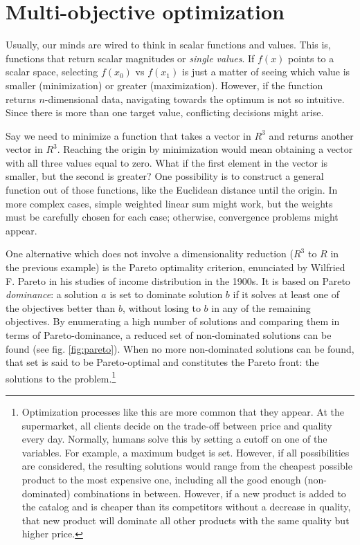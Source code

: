 \section{Multi-objective optimization}
\label{section:multiobjective}

Usually, our minds are wired to think in scalar functions and values. This is, functions that return scalar magnitudes or \textit{single values}. If $f(x)$ points to a scalar space, selecting $f(x_{0})$ vs $f(x_{1})$ is just a matter of seeing which value is smaller (minimization) or greater (maximization). However, if the function returns $n$-dimensional data, navigating towards the optimum is not so intuitive. Since there is more than one target value, conflicting decisions might arise.

Say we need to minimize a function that takes a vector in $R^{3}$ and returns another vector in $R^{3}$. Reaching the origin by minimization would mean obtaining a vector with all three values equal to zero. What if the first element in the vector is smaller, but the second is greater? One possibility is to construct a general function out of those functions, like the Euclidean distance until the origin. In more complex cases, simple weighted linear sum might work, but the weights must be carefully chosen for each case; otherwise, convergence problems might appear.\cite{das1997closer}

One alternative which does not involve a dimensionality reduction ($R^{3}$ to $R$ in the previous example) is the Pareto optimality criterion, enunciated by Wilfried F. Pareto in his studies of income distribution in the 1900s. It is based on Pareto \textit{dominance}: a solution $a$ is set to dominate solution $b$ if it solves at least one of the objectives better than $b$, without losing to $b$ in any of the remaining objectives.\cite{deb1999multi} By enumerating a high number of solutions and comparing them in terms of Pareto-dominance, a reduced set of non-dominated solutions can be found (see fig. \ref{fig:pareto}). When no more non-dominated solutions can be found, that set is said to be Pareto-optimal and constitutes the Pareto front: the solutions to the problem.\footnote{Optimization processes like this are more common that they appear. At the supermarket, all clients decide on the trade-off between price and quality every day. Normally, humans solve this by setting a cutoff on one of the variables. For example, a maximum budget is set. However, if all possibilities are considered, the resulting solutions would range from the cheapest possible product to the most expensive one, including all the good enough (non-dominated) combinations in between. However, if a new product is added to the catalog and is cheaper than its competitors without a decrease in quality, that new product will dominate all other products with the same quality but higher price.}

